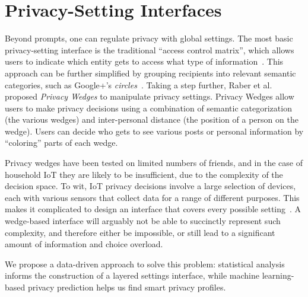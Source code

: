 
\section{Privacy-Setting Interfaces}
Beyond prompts, one can regulate privacy with global settings. The most basic privacy-setting interface is the traditional ``access control matrix'', which allows users to indicate which entity gets to access what type of information~\cite{sandhu1994access}. This approach can be further simplified by grouping recipients into relevant semantic categories, such as Google+'s \emph{circles}~\cite{watson12}. Taking a step further, Raber et al.~\cite{197908} proposed \emph{Privacy Wedges} to manipulate privacy settings. Privacy Wedges allow users to make privacy decisions using a combination of semantic categorization (the various wedges) and inter-personal distance (the position of a person on the wedge). Users can decide who gets to see various posts or personal information by ``coloring'' parts of each wedge. 

Privacy wedges have been tested on limited numbers of friends, and in the case of household IoT they are likely to be insufficient, due to the complexity of the decision space. To wit, IoT privacy decisions involve a large selection of devices, each with various sensors that collect data for a range of different purposes. This makes it complicated to design an interface that covers every possible setting~\cite{williams2016perfect}. A wedge-based interface will arguably not be able to succinctly represent such complexity, and therefore either be impossible, or still lead to a significant amount of information and choice overload. 

We propose a data-driven approach to solve this problem: statistical analysis informs the construction of a layered settings interface, while machine learning-based privacy prediction helps us find smart privacy profiles.


